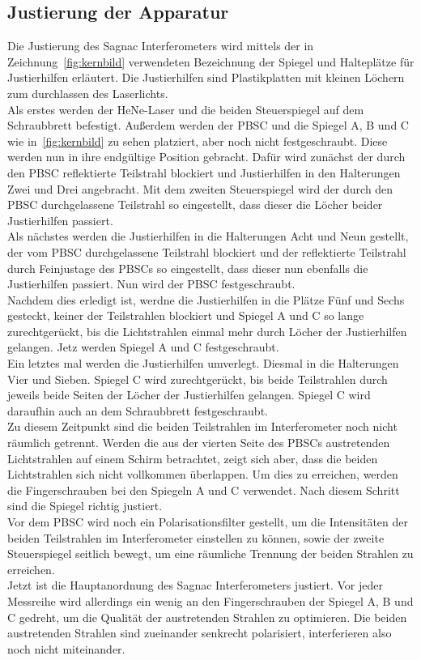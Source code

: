 \subsection{Justierung der Apparatur}
%
Die Justierung des Sagnac Interferometers wird mittels der in 
Zeichnung~\ref{fig:kernbild} verwendeten Bezeichnung der Spiegel 
und Halteplätze für Justierhilfen erläutert. Die Justierhilfen 
sind Plastikplatten mit kleinen Löchern zum durchlassen des 
Laserlichts.\\
%
%
Als erstes werden der HeNe-Laser und die beiden 
Steuerspiegel auf dem 
Schraubbrett befestigt. Außerdem werden der PBSC und 
die Spiegel A, B und C wie in~\ref{fig:kernbild} zu sehen platziert, 
aber noch nicht festgeschraubt.
 Diese werden nun in ihre endgültige Position gebracht.
Dafür wird zunächst der durch den PBSC reflektierte Teilstrahl 
blockiert und Justierhilfen in den Halterungen Zwei und Drei 
angebracht. Mit dem zweiten Steuerspiegel wird der durch den PBSC 
durchgelassene Teilstrahl so eingestellt, dass dieser die Löcher 
beider Justierhilfen passiert.\\
Als nächstes werden die Justierhilfen in die Halterungen Acht und 
Neun gestellt, der vom PBSC durchgelassene Teilstrahl blockiert und 
der reflektierte Teilstrahl durch Feinjustage des PBSCs so 
eingestellt, dass dieser nun ebenfalls die Justierhilfen passiert. 
Nun wird der PBSC festgeschraubt.\\
Nachdem dies erledigt ist, werdne die Justierhilfen in die Plätze 
Fünf und Sechs gesteckt, keiner der Teilstrahlen blockiert und 
Spiegel A und C so lange zurechtgerückt, bis die Lichtstrahlen 
einmal mehr durch Löcher der Justierhilfen gelangen. Jetz 
werden Spiegel A und C festgeschraubt.\\
Ein letztes mal werden die Justierhilfen umverlegt. Diesmal 
in die Halterungen Vier und Sieben. Spiegel C wird zurechtgerückt, 
bis beide Teilstrahlen durch jeweils beide Seiten der Löcher der 
Justierhilfen gelangen. Spiegel C wird daraufhin auch an dem 
Schraubbrett festgeschraubt.\\
Zu diesem Zeitpunkt sind die beiden Teilstrahlen im Interferometer 
noch nicht räumlich getrennt. Werden die aus der vierten Seite des 
PBSCs austretenden Lichtstrahlen auf einem Schirm betrachtet, zeigt 
sich aber, dass die beiden Lichtstrahlen sich nicht vollkommen 
überlappen. Um dies zu erreichen, werden die Fingerschrauben bei 
den Spiegeln A und C verwendet. Nach diesem Schritt sind die Spiegel 
richtig justiert.\\
Vor dem PBSC wird noch ein Polarisationsfilter gestellt, um die 
Intensitäten der beiden Teilstrahlen im Interferometer einstellen 
zu können, sowie der zweite Steuerspiegel seitlich bewegt, um 
eine räumliche Trennung der beiden Strahlen zu erreichen.\\
Jetzt ist die Hauptanordnung des Sagnac Interferometers justiert. 
Vor jeder Messreihe wird allerdings ein wenig an den Fingerschrauben 
der Spiegel A, B und C gedreht, um die Qualität der austretenden 
Strahlen zu optimieren.
Die beiden austretenden Strahlen sind zueinander senkrecht 
polarisiert, interferieren also noch nicht miteinander.\\
%
